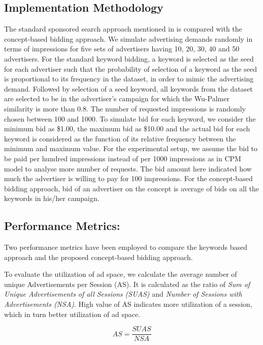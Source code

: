 \subsection{Implementation Methodology}

The standard sponsored search approach mentioned in \cite{mehta2007adwords} is compared with the concept-based bidding approach. We simulate advertising demands randomly in terms of impressions for five sets of advertisers having 10, 20, 30, 40 and 50 advertisers. For the standard keyword bidding, a keyword is selected as the seed for each advertiser such that the probability of selection of a keyword as the seed is proportional to its frequency in the dataset, in order to mimic the advertising demand. Followed by selection of a seed keyword, all keywords from the dataset are selected to be in the advertiser's campaign for which the Wu-Palmer similarity is more than 0.8. The number of requested impressions is randomly chosen between 100 and 1000. To simulate bid for each keyword, we consider the minimum bid as \$1.00,  the maximum bid as \$10.00 and the actual bid for each keyword is considered as the function of its relative frequency between the minimum and maximum value. For the experimental setup, we assume the bid to be paid per hundred impressions instead of per 1000 impressions as in CPM model to analyse more number of requests. The bid amount here indicated how much the advertiser is willing to pay for 100 impressions. For the concept-based bidding approach, bid of an advertiser on the concept is average of bids on all the keywords in his/her campaign.

\subsection{Performance Metrics:}Two performance metrics have been employed to compare the keywords based approach \cite{mehta2007adwords} and the proposed concept-based bidding approach.

To evaluate the utilization of ad space, we calculate the average number of unique Advertisements per Session (AS). It is calculated as the ratio of {\it Sum of Unique Advertisements of all Sessions (SUAS)} and {\it Number of Sessions with Advertisements (NSA)}. High value of AS indicates more utilization of a session, which in turn better utilization of ad space.

\begin{equation}
AS = \frac{SUAS}{NSA}
\end{equation}



